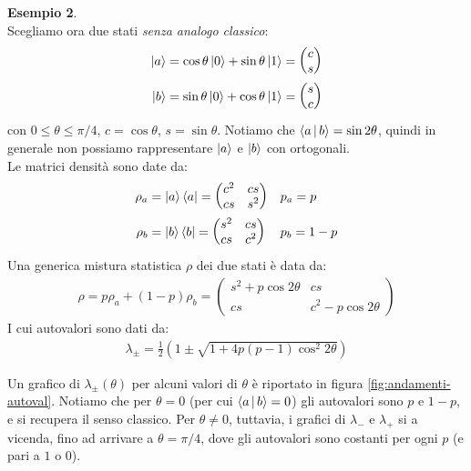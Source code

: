 \documentclass[../../InformazioneQuantistica.tex]{subfiles}
\begin{document}
\textbf{Esempio 2}.\\
Scegliamo ora due stati \textit{senza analogo classico}:
\begin{align*}
\Ket{a} &= \cos\theta \Ket{0} + \sin\theta \Ket{1} = \begin{pmatrix} c \\ s\end{pmatrix} \\
\Ket{b} &= \sin\theta \Ket{0} + \cos\theta \Ket{1} = \begin{pmatrix}s \\ c\end{pmatrix}
\end{align*}
con $0\leq \theta \leq \pi/4$, $c=\cos\theta$, $s=\sin\theta$. Notiamo che $\Braket{a|b} = \sin2\theta$, quindi in generale non possiamo rappresentare $\Ket{a}$ e $\Ket{b}$ con  ortogonali.\\
Le matrici densità sono date da:
\begin{align*}
\rho_a &= \Ket{a}\Bra{a} = \begin{pmatrix} c^2 & cs\\ cs & s^2\end{pmatrix} && p_a = p\\
\rho_b &= \Ket{b}\Bra{b} = \begin{pmatrix} s^2 & cs\\ cs & c^2 \end{pmatrix}&& p_b = 1-p
\end{align*}
Una generica mistura statistica $\rho$ dei due stati è data da:
\begin{align*}
\rho = p \rho_a + (1-p)\rho_b = \begin{pmatrix} s^2 + p\cos2\theta & cs\\ cs & c^2 - p\cos2\theta \end{pmatrix}
\end{align*}
I cui autovalori sono dati da:
\begin{align*}
\lambda_{\pm} = \frac{1}{2}(1\pm \sqrt{1+4p(p-1)\cos^2 2 \theta})
\end{align*}

Un grafico di $\lambda_\pm (\theta)$ per alcuni valori di $\theta$ è riportato in figura \ref{fig:andamenti-autoval}. Notiamo che per $\theta=0$ (per cui $\Braket{a|b} = 0$) gli autovalori sono $p$ e $1-p$, e si recupera il senso classico. Per $\theta \neq 0$, tuttavia, i grafici di $\lambda_-$ e $\lambda_+$ si  a vicenda, fino ad arrivare a $\theta=\pi/4$, dove gli autovalori sono costanti per ogni $p$ (e pari a $1$ o $0$).\\
\end{document}
